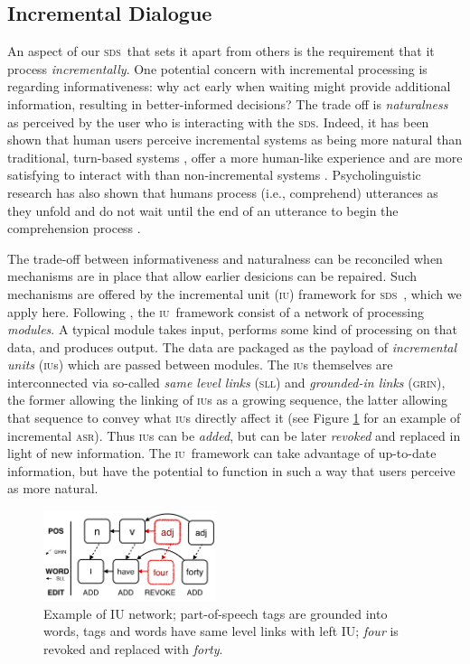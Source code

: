 \documentclass[11pt]{article}
\newcommand{\sds}[0]{\textsc{sds}}
\newcommand{\asr}[0]{\textsc{asr}}
\newcommand{\iu}[0]{\textsc{iu}}
\begin{document}
\subsection{Incremental Dialogue}

An aspect of our \sds\ that sets it apart from others is the requirement that it process \emph{incrementally}. One potential concern with incremental processing is regarding informativeness: why act early when waiting might provide additional information, resulting in better-informed decisions? The trade off is \emph{naturalness} as perceived by the user who is interacting with the \sds. Indeed, it has been shown that human users perceive incremental systems as being more natural than traditional, turn-based systems \cite{Aist2006,Skantze2009,skantze2010sigdial,Asri2014}, offer a more human-like experience  \cite{Edlund2008b} and are more satisfying to interact with than non-incremental systems \cite{Aistetal:incrunder-short}. Psycholinguistic research has also shown that humans process (i.e., comprehend) utterances as they unfold and do not wait until the end of an utterance to begin the comprehension process \cite{Tanenhaus1995,Spivey_2002tw}. 

The trade-off between informativeness and naturalness can be reconciled when mechanisms are in place that allow earlier desicions can be repaired. Such mechanisms are offered by the incremental unit (\iu) framework for \sds\ \cite{Schlangen2011}, which we apply here. Following , the \iu\ framework consist of a network of processing \emph{modules}. A typical module takes input, performs some kind of processing on that data, and produces output. The data are packaged as the payload of \emph{incremental units} (\textsc{iu}s) which are passed between modules. The \textsc{iu}s themselves are interconnected via so-called \emph{same level links} (\textsc{sll}) and \emph{grounded-in links} (\textsc{grin}), the former allowing the linking of \textsc{iu}s as a growing sequence, the latter allowing that sequence to convey what \textsc{iu}s directly affect it (see Figure \ref{fig:iu_example} for an example of incremental \asr). Thus \iu s can be \emph{added}, but can be later \emph{revoked} and replaced in light of new information. The \iu\ framework can take advantage of up-to-date information, but have the potential to function in such a way that users perceive as more natural.

\begin{figure} %
  \centering
      \includegraphics[width=0.45\textwidth]{figures/005_iu_example.png}	
      \caption{Example of IU network; part-of-speech tags are grounded into words, tags and words have same level links with left IU; \emph{four} is revoked and replaced with \emph{forty}.\label{fig:iu_example}}
            \vspace{-0.25cm}
\end{figure}
\end{document}
